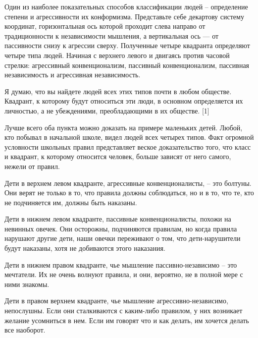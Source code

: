 \documentclass[ebook,12pt,oneside,openany]{memoir}
\begin{document}
\maketitle

Один из наиболее показательных способов классификации людей –
определение степени и агрессивности их конформизма. Представьте себе
декартову систему координат, горизонтальная ось которой проходит слева
направо от традиционности к независимости мышления, а вертикальная ось
— от пассивности снизу к агрессии сверху. Полученные четыре квадранта
определяют четыре типа людей. Начиная с верхнего левого и двигаясь
против часовой стрелки: агрессивный конвенционализм, пассивный
конвенционализм, пассивная независимость и агрессивная независимость. \newline

Я думаю, что вы найдете людей всех этих типов почти в любом обществе.
Квадрант, к которому будут относиться эти люди, в основном
определяется их личностью, а не убеждениями, преобладающими в их
обществе. [1] \newline

Лучше всего оба пункта можно доказать на примере маленьких детей.
Любой, кто побывал в начальной школе, видел людей всех четырех типов.
Факт огромной условности школьных правил представляет веское
доказательство того, что класс и квадрант, к которому относится
человек, больше зависят от него самого, нежели от правил. \newline

Дети в верхнем левом квадранте, агрессивные конвенционалисты, – это
болтуны. Они верят не только в то, что правила должны соблюдаться, но
и в то, что те, кто не подчиняется им, должны быть наказаны. \newline

Дети в нижнем левом квадранте, пассивные конвенционалисты, похожи на
невинных овечек. Они осторожны, подчиняются правилам, но когда правила
нарушают другие дети, наши овечки переживают о том, что
дети-нарушители будут наказаны, хотя не добиваются этого наказания. \newline

Дети в нижнем правом квадранте, чье мышление пассивно-независимо – это
мечтатели. Их не очень волнуют правила, и они, вероятно, не в полной
мере с ними знакомы. \newline

Дети в правом верхнем квадранте, чье мышление агрессивно-независимо,
непослушны. Если они сталкиваются с каким-либо правилом, у них
возникает желание усомниться в нем. Если им говорят что и как делать,
им хочется делать все наоборот. \newline
\end{document}

